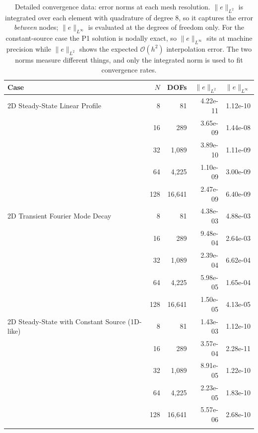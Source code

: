 \begin{table}[htbp]
\centering\footnotesize
\caption{Detailed convergence data: error norms at each mesh resolution.  $\|e\|_{L^2}$ is integrated over each element with quadrature of degree 8, so it captures the error \emph{between} nodes; $\|e\|_{L^\infty}$ is evaluated at the degrees of freedom only.  For the constant-source case the P1 solution is nodally exact, so $\|e\|_{L^\infty}$ sits at machine precision while $\|e\|_{L^2}$ shows the expected $\mathcal{O}(h^2)$ interpolation error.  The two norms measure different things, and only the integrated norm is used to fit convergence rates.}
\label{tab:vv-detail}
\begin{tabular}{lrrrr}
\toprule
Case & $N$ & DOFs & $\|e\|_{L^2}$ & $\|e\|_{L^\infty}$ \\
\midrule
  2D Steady-State Linear Profile & 8 & 81 & 4.22e-11 & 1.12e-10 \\
   & 16 & 289 & 3.65e-09 & 1.44e-08 \\
   & 32 & 1,089 & 3.89e-10 & 1.11e-09 \\
   & 64 & 4,225 & 1.10e-09 & 3.00e-09 \\
   & 128 & 16,641 & 2.47e-09 & 6.40e-09 \\
\addlinespace
  2D Transient Fourier Mode Decay & 8 & 81 & 4.38e-03 & 4.88e-03 \\
   & 16 & 289 & 9.48e-04 & 2.64e-03 \\
   & 32 & 1,089 & 2.39e-04 & 6.62e-04 \\
   & 64 & 4,225 & 5.98e-05 & 1.65e-04 \\
   & 128 & 16,641 & 1.50e-05 & 4.13e-05 \\
\addlinespace
  2D Steady-State with Constant Source (1D-like) & 8 & 81 & 1.43e-03 & 1.12e-10 \\
   & 16 & 289 & 3.57e-04 & 2.28e-11 \\
   & 32 & 1,089 & 8.91e-05 & 1.22e-10 \\
   & 64 & 4,225 & 2.23e-05 & 1.83e-10 \\
   & 128 & 16,641 & 5.57e-06 & 2.68e-10 \\
\addlinespace
\bottomrule
\end{tabular}
\end{table}